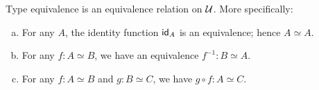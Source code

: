 \begin{prop}\label{prop:equivalence-is-an-equivalence-relation}
    Type equivalence is an equivalence relation on\/ $\mathcal U$. More specifically:
    \begin{enumerate}[a),font=\upshape]
        \item For any\/ $A$, the identity function\/ $\mathsf{id}_A$ is an equivalence; hence\/ $A\simeq A$.
        
        \item For any\/ $f\colon A\simeq B$, we have an equivalence\/ $f^{-1}\colon B\simeq A$.
        
        \item For any\/ $f\colon A\simeq B$ and\/ $g\colon B\simeq C$, we have\/ $g\circ f\colon A\simeq C$.
    \end{enumerate}
\end{prop}

